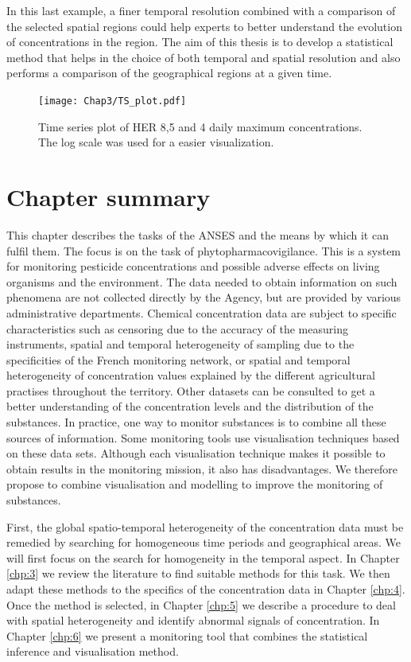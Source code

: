 In this last example, a finer temporal resolution combined with a comparison of the selected spatial regions could help experts to better understand the evolution of concentrations in the region. The aim of this thesis is to develop a statistical method that helps in the choice of both temporal and spatial resolution and also performs a comparison of the geographical regions at a given time.

\begin{figure}[ht]
    \centering
    \texttt{[image: Chap3/TS\_plot.pdf]}
    \caption{Time series plot of HER 8,5 and 4 daily maximum concentrations. The log scale was used for a easier visualization.}
    \label{fig:tsplot_ex}
\end{figure}

\clearpage

\section{Chapter summary}

This chapter describes the tasks of the ANSES and the means by which it can fulfil them. The focus is on the task of phytopharmacovigilance. This is a system for monitoring pesticide concentrations and possible adverse effects on living organisms and the environment. The data needed to obtain information on such phenomena are not collected directly by the Agency, but are provided by various administrative departments. Chemical concentration data are subject to specific characteristics such as censoring due to the accuracy of the measuring instruments, spatial and temporal heterogeneity of sampling due to the specificities of the French monitoring network, or spatial and temporal heterogeneity of concentration values explained by the different agricultural practises throughout the territory. Other datasets can be consulted to get a better understanding of the concentration levels and the distribution of the substances. In practice, one way to monitor substances is to combine all these sources of information. Some monitoring tools use visualisation techniques based on these data sets. Although each visualisation technique makes it possible to obtain results in the monitoring mission, it also has disadvantages. We therefore propose to combine visualisation and modelling to improve the monitoring of substances. 

First, the global spatio-temporal heterogeneity of the concentration data must be remedied by searching for homogeneous time periods and geographical areas. We will first focus on the search for homogeneity in the temporal aspect. In Chapter \ref{chp:3} we review the literature to find suitable methods for this task. We then adapt these methods to the specifics of the concentration data in Chapter \ref{chp:4}. Once the method is selected, in Chapter \ref{chp:5} we describe a procedure to deal with spatial heterogeneity and identify abnormal signals of concentration. In Chapter \ref{chp:6} we present a monitoring tool that combines the statistical inference and visualisation method.  



